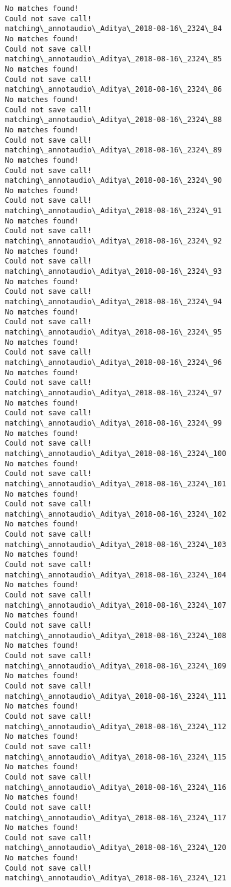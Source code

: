 \documentclass[11pt]{article}
\begin{document}
\begin{Verbatim}[commandchars=\\\{\}]
No matches found!
Could not save call!
matching\_annotaudio\_Aditya\_2018-08-16\_2324\_84
No matches found!
Could not save call!
matching\_annotaudio\_Aditya\_2018-08-16\_2324\_85
No matches found!
Could not save call!
matching\_annotaudio\_Aditya\_2018-08-16\_2324\_86
No matches found!
Could not save call!
matching\_annotaudio\_Aditya\_2018-08-16\_2324\_88
No matches found!
Could not save call!
matching\_annotaudio\_Aditya\_2018-08-16\_2324\_89
No matches found!
Could not save call!
matching\_annotaudio\_Aditya\_2018-08-16\_2324\_90
No matches found!
Could not save call!
matching\_annotaudio\_Aditya\_2018-08-16\_2324\_91
No matches found!
Could not save call!
matching\_annotaudio\_Aditya\_2018-08-16\_2324\_92
No matches found!
Could not save call!
matching\_annotaudio\_Aditya\_2018-08-16\_2324\_93
No matches found!
Could not save call!
matching\_annotaudio\_Aditya\_2018-08-16\_2324\_94
No matches found!
Could not save call!
matching\_annotaudio\_Aditya\_2018-08-16\_2324\_95
No matches found!
Could not save call!
matching\_annotaudio\_Aditya\_2018-08-16\_2324\_96
No matches found!
Could not save call!
matching\_annotaudio\_Aditya\_2018-08-16\_2324\_97
No matches found!
Could not save call!
matching\_annotaudio\_Aditya\_2018-08-16\_2324\_99
No matches found!
Could not save call!
matching\_annotaudio\_Aditya\_2018-08-16\_2324\_100
No matches found!
Could not save call!
matching\_annotaudio\_Aditya\_2018-08-16\_2324\_101
No matches found!
Could not save call!
matching\_annotaudio\_Aditya\_2018-08-16\_2324\_102
No matches found!
Could not save call!
matching\_annotaudio\_Aditya\_2018-08-16\_2324\_103
No matches found!
Could not save call!
matching\_annotaudio\_Aditya\_2018-08-16\_2324\_104
No matches found!
Could not save call!
matching\_annotaudio\_Aditya\_2018-08-16\_2324\_107
No matches found!
Could not save call!
matching\_annotaudio\_Aditya\_2018-08-16\_2324\_108
No matches found!
Could not save call!
matching\_annotaudio\_Aditya\_2018-08-16\_2324\_109
No matches found!
Could not save call!
matching\_annotaudio\_Aditya\_2018-08-16\_2324\_111
No matches found!
Could not save call!
matching\_annotaudio\_Aditya\_2018-08-16\_2324\_112
No matches found!
Could not save call!
matching\_annotaudio\_Aditya\_2018-08-16\_2324\_115
No matches found!
Could not save call!
matching\_annotaudio\_Aditya\_2018-08-16\_2324\_116
No matches found!
Could not save call!
matching\_annotaudio\_Aditya\_2018-08-16\_2324\_117
No matches found!
Could not save call!
matching\_annotaudio\_Aditya\_2018-08-16\_2324\_120
No matches found!
Could not save call!
matching\_annotaudio\_Aditya\_2018-08-16\_2324\_121

\end{Verbatim}
\end{document}
